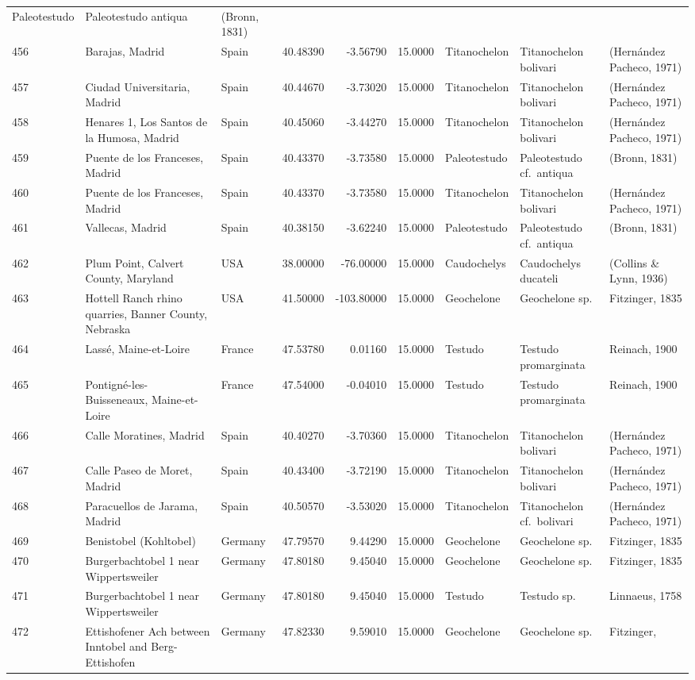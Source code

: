 \documentclass[]{article}
\begin{document}
\begin{longtable}[]{@{}lllrrrlll@{}}
Paleotestudo & Paleotestudo antiqua & (Bronn, 1831)\tabularnewline
456 & Barajas, Madrid & Spain & 40.48390 & -3.56790 & 15.0000 &
Titanochelon & Titanochelon bolivari & (Hernández Pacheco,
1971)\tabularnewline
457 & Ciudad Universitaria, Madrid & Spain & 40.44670 & -3.73020 &
15.0000 & Titanochelon & Titanochelon bolivari & (Hernández Pacheco,
1971)\tabularnewline
458 & Henares 1, Los Santos de la Humosa, Madrid & Spain & 40.45060 &
-3.44270 & 15.0000 & Titanochelon & Titanochelon bolivari & (Hernández
Pacheco, 1971)\tabularnewline
459 & Puente de los Franceses, Madrid & Spain & 40.43370 & -3.73580 &
15.0000 & Paleotestudo & Paleotestudo cf.~antiqua & (Bronn,
1831)\tabularnewline
460 & Puente de los Franceses, Madrid & Spain & 40.43370 & -3.73580 &
15.0000 & Titanochelon & Titanochelon bolivari & (Hernández Pacheco,
1971)\tabularnewline
461 & Vallecas, Madrid & Spain & 40.38150 & -3.62240 & 15.0000 &
Paleotestudo & Paleotestudo cf.~antiqua & (Bronn, 1831)\tabularnewline
462 & Plum Point, Calvert County, Maryland & USA & 38.00000 & -76.00000
& 15.0000 & Caudochelys & Caudochelys ducateli & (Collins \& Lynn,
1936)\tabularnewline
463 & Hottell Ranch rhino quarries, Banner County, Nebraska & USA &
41.50000 & -103.80000 & 15.0000 & Geochelone & Geochelone sp. &
Fitzinger, 1835\tabularnewline
464 & Lassé, Maine-et-Loire & France & 47.53780 & 0.01160 & 15.0000 &
Testudo & Testudo promarginata & Reinach, 1900\tabularnewline
465 & Pontigné-les-Buisseneaux, Maine-et-Loire & France & 47.54000 &
-0.04010 & 15.0000 & Testudo & Testudo promarginata & Reinach,
1900\tabularnewline
466 & Calle Moratines, Madrid & Spain & 40.40270 & -3.70360 & 15.0000 &
Titanochelon & Titanochelon bolivari & (Hernández Pacheco,
1971)\tabularnewline
467 & Calle Paseo de Moret, Madrid & Spain & 40.43400 & -3.72190 &
15.0000 & Titanochelon & Titanochelon bolivari & (Hernández Pacheco,
1971)\tabularnewline
468 & Paracuellos de Jarama, Madrid & Spain & 40.50570 & -3.53020 &
15.0000 & Titanochelon & Titanochelon cf.~bolivari & (Hernández Pacheco,
1971)\tabularnewline
469 & Benistobel (Kohltobel) & Germany & 47.79570 & 9.44290 & 15.0000 &
Geochelone & Geochelone sp. & Fitzinger, 1835\tabularnewline
470 & Burgerbachtobel 1 near Wippertsweiler & Germany & 47.80180 &
9.45040 & 15.0000 & Geochelone & Geochelone sp. & Fitzinger,
1835\tabularnewline
471 & Burgerbachtobel 1 near Wippertsweiler & Germany & 47.80180 &
9.45040 & 15.0000 & Testudo & Testudo sp. & Linnaeus,
1758\tabularnewline
472 & Ettishofener Ach between Inntobel and Berg-Ettishofen & Germany &
47.82330 & 9.59010 & 15.0000 & Geochelone & Geochelone sp. & Fitzinger,

\end{longtable}
\end{document}
